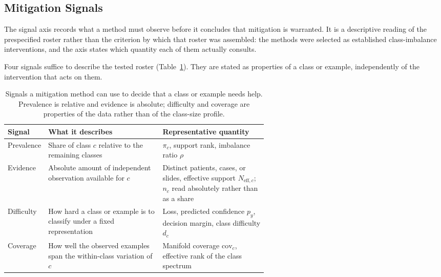 \documentclass[11pt]{article}
\begin{document}
\subsection{Mitigation Signals}
\label{sec:signal-axis}
The signal axis records what a method must observe before it concludes that mitigation is warranted. It is a descriptive reading of the prespecified roster rather than the criterion by which that roster was assembled: the methods were selected as established class-imbalance interventions, and the axis states which quantity each of them actually consults.

Four signals suffice to describe the tested roster (Table~\ref{tab:signals}). They are stated as properties of a class or example, independently of the intervention that acts on them.

\begin{table}[ht]
  \centering
  \footnotesize
  \begin{tabularx}{\linewidth}{@{}>{\raggedright\arraybackslash}p{0.15\linewidth}>{\raggedright\arraybackslash}p{0.44\linewidth}>{\raggedright\arraybackslash}X@{}}
    \toprule
    Signal & What it describes & Representative quantity \\
    \midrule
    Prevalence & Share of class $c$ relative to the remaining classes & $\pi_c$, support rank, imbalance ratio $\rho$ \\
    Evidence & Absolute amount of independent observation available for $c$ & Distinct patients, cases, or slides, effective support $N_{\mathrm{eff},c}$; $n_c$ read absolutely rather than as a share \\
    Difficulty & How hard a class or example is to classify under a fixed representation & Loss, predicted confidence $p_y$, decision margin, class difficulty $d_c$ \\
    Coverage & How well the observed examples span the within-class variation of $c$ & Manifold coverage $\mathrm{cov}_c$, effective rank of the class spectrum \\
    \bottomrule
  \end{tabularx}
  \caption{Signals a mitigation method can use to decide that a class or example needs help. Prevalence is relative and evidence is absolute; difficulty and coverage are properties of the data rather than of the class-size profile.}
  \label{tab:signals}
\end{table}
\end{document}
